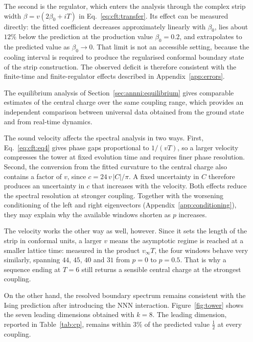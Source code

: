 The second is the regulator, which enters the analysis through the complex strip width $\beta=v(2\beta_0+iT)$ in Eq.~\eqref{eq:cft:transfer}. Its effect can be measured directly: the fitted coefficient decreases approximately linearly with $\beta_0$, lies about $12\%$ below the prediction at the production value $\beta_0=0.2$, and extrapolates to the predicted value as $\beta_0\to0$. That limit is not an accessible setting, because the cooling interval is required to produce the regularised conformal boundary state of the strip construction. The observed deficit is therefore consistent with the finite-time and finite-regulator effects described in Appendix~\ref{app:errors}.

The equilibrium analysis of Section~\ref{sec:annni:equilibrium} gives comparable estimates of the central charge over the same coupling range, which provides an independent comparison between universal data obtained from the ground state and from real-time dynamics.

The sound velocity affects the spectral analysis in two ways. First, Eq.~\eqref{eq:cft:eq4} gives phase gaps proportional to $1/(vT)$, so a larger velocity compresses the tower at fixed evolution time and requires finer phase resolution. Second, the conversion from the fitted curvature to the central charge also contains a factor of $v$, since $c=24\,v\,|C|/\pi$. A fixed uncertainty in $C$ therefore produces an uncertainty in $c$ that increases with the velocity. Both effects reduce the spectral resolution at stronger coupling. Together with the worsening conditioning of the left and right eigenvectors (Appendix~\ref{app:conditioning}), they may explain why the available windows shorten as $p$ increases.

The velocity works the other way as well, however. Since it sets the length of the strip in conformal units, a larger $v$ means the asymptotic regime is reached at a smaller lattice time: measured in the product $v_\infty T$, the four windows behave very similarly, spanning $44$, $45$, $40$ and $31$ from $p=0$ to $p=0.5$. That is why a sequence ending at $T=6$ still returns a sensible central charge at the strongest coupling.

On the other hand, the resolved boundary spectrum remains consistent with the Ising prediction after introducing the \ac{NNN} interaction. Figure~\ref{fig:tower} shows the seven leading dimensions obtained with $k=8$. The leading dimension, reported in Table~\ref{tab:cp}, remains within $3\%$ of the predicted value $\tfrac12$ at every coupling.

